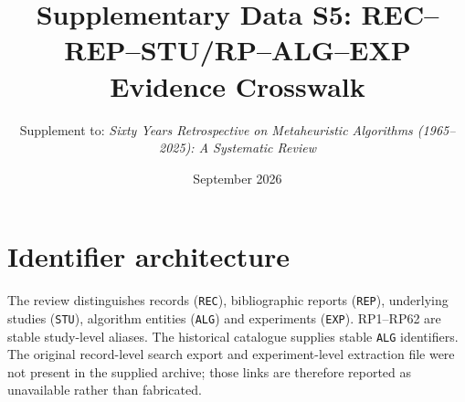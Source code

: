 \documentclass[9pt]{article}
\title{Supplementary Data S5: REC--REP--STU/RP--ALG--EXP Evidence Crosswalk}
\author{Supplement to: \textit{Sixty Years Retrospective on Metaheuristic Algorithms (1965--2025): A Systematic Review}}
\date{September 2026}
\begin{document}
\maketitle
\section*{Identifier architecture}
The review distinguishes records (\texttt{REC}), bibliographic reports (\texttt{REP}), underlying studies (\texttt{STU}), algorithm entities (\texttt{ALG}) and experiments (\texttt{EXP}). RP1--RP62 are stable study-level aliases. The historical catalogue supplies stable \texttt{ALG} identifiers. The original record-level search export and experiment-level extraction file were not present in the supplied archive; those links are therefore reported as unavailable rather than fabricated.
\end{document}
